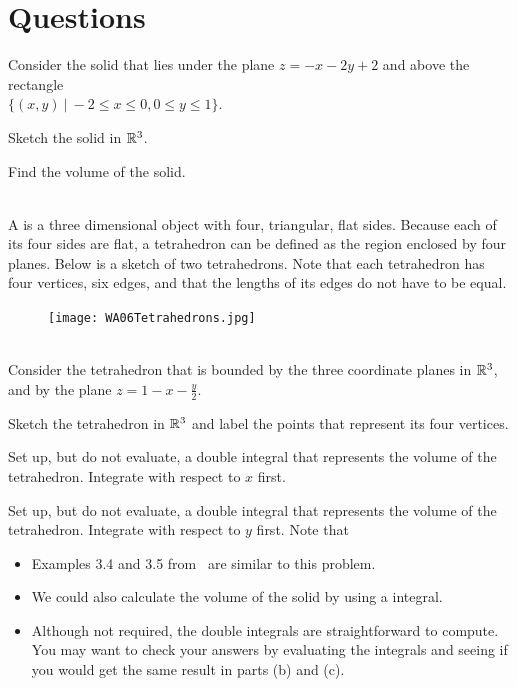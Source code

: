 \documentclass{article}
\begin{document}
\section*{Questions}
\BEN
\item %
Consider the solid that lies under the plane $z = -x-2y+2$ and above the rectangle \\$\{(x,y) \ | \ -2\le x\le 0, 0\le y \le1 \}$.
\BEN
\item Sketch the solid in $\mathbb{R}^3$. 
\item Find the volume of the solid.
\EEN
\item %
 \\
A  is a three dimensional object with four, triangular, flat sides. Because each of its four sides are flat, a tetrahedron can be defined as the region enclosed by four planes. Below is a sketch of two tetrahedrons. Note that each tetrahedron has four vertices, six edges, and that the lengths of its edges do not have to be equal.
\begin{figure}[h]
  \vspace{-1pt}
  \begin{center}
    \texttt{[image: WA06Tetrahedrons.jpg]}
  \end{center}
\end{figure}\\
Consider the tetrahedron that is bounded by the three coordinate planes in $\mathbb{R}^3$, and by the plane $z = 1 - x - \frac{y}{2}$.
\BEN
\item Sketch the tetrahedron in $\mathbb{R}^3$ and label the points that represent its four vertices. 
\item Set up, but do not evaluate, a double integral that represents the volume of the tetrahedron. Integrate with respect to $x$ first. 
\item Set up, but do not evaluate, a double integral that represents the volume of the tetrahedron. Integrate with respect to $y$ first. 
\EEN
Note that
\begin{itemize}
\item Examples 3.4 and 3.5 from \VCT \ are similar to this problem. 
\item We could also calculate the volume of the solid by using a  integral. 
\item Although not required, the double integrals are straightforward to compute. You may want to check your answers by evaluating the integrals and seeing if you would get the same result in parts (b) and (c). 
\end{itemize}
\end{document}
